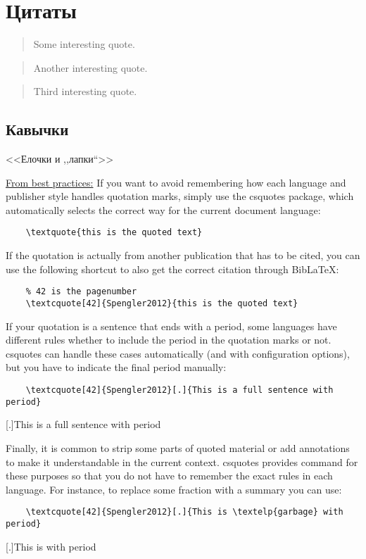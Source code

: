 \section{Цитаты}
\blockquote[{\autocite{Tasnadi2006}}]{Some interesting quote.}

\blockquote[{\autocite{Spengler2012}}]{Another interesting quote.}

\blockquote[{\autocite{TheMendeleySupportTeam2011}}]{Third interesting quote.}

\subsection{Кавычки}
<<Елочки и ,,лапки``>>

\href{https://www.semipol.de/posts/2018/06/latex-best-practices-lessons-learned-from-writing-a-phd-thesis/}{From best practices:}
If you want to avoid remembering how each language and publisher style handles quotation marks, simply use the csquotes package, which automatically selects the correct way for the current document language:
\begin{verbatim}
    \textquote{this is the quoted text}
\end{verbatim}

If the quotation is actually from another publication that has to be cited, you can use the following shortcut to also get the correct citation through BibLaTeX:
\begin{verbatim}
    % 42 is the pagenumber
    \textcquote[42]{Spengler2012}{this is the quoted text}
\end{verbatim}

If your quotation is a sentence that ends with a period, some languages have different rules whether to include the period in the quotation marks or not.
csquotes can handle these cases automatically (and with configuration options), but you have to indicate the final period manually:
\begin{verbatim}
    \textcquote[42]{Spengler2012}[.]{This is a full sentence with period}
\end{verbatim}
[.]{This is a full sentence with period}

Finally, it is common to strip some parts of quoted material or add annotations to make it understandable in the current context.
csquotes provides command for these purposes so that you do not have to remember the exact rules in each language.
For instance, to replace some fraction with a summary you can use:
\begin{verbatim}
    \textcquote[42]{Spengler2012}[.]{This is \textelp{garbage} with  period}
\end{verbatim}
[.]{This is  with  period}









